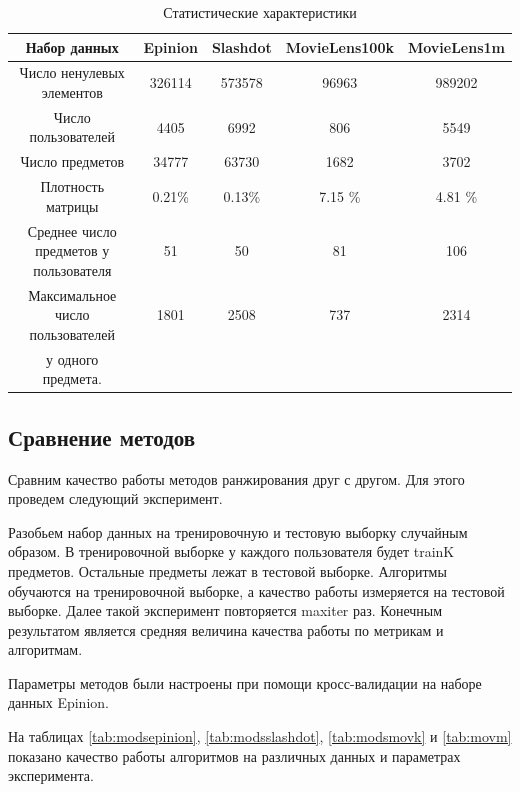 \documentclass[a4paper,12pt]{article}
\begin{document}
\begin{table}[H]
\caption{\label{tab:canonsummary}Статистические характеристики}
\begin{center}
\begin{tabular}{|c|c c c c|}
\hline
Набор данных  & Epinion & Slashdot & MovieLens100k & MovieLens1m\\
\hline
Число ненулевых элементов & 326114 & 573578 & 96963  & 989202 \\
Число пользователей & 4405 & 6992 & 806 & 5549\\
Число предметов & 34777 & 63730 & 1682 & 3702\\
Плотность матрицы & 0.21\% & 0.13\% & 7.15 \% & 4.81 \% \\
Среднее число предметов у пользователя & 51  & 50 & 81 & 106\\
Максимальное число пользователей & 1801 & 2508 & 737 & 2314\\
у одного предмета.  & & & &\\
\hline
\end{tabular}
\end{center}
\end{table} 

\subsection{Сравнение методов}
 Сравним качество работы методов ранжирования друг с другом. Для этого проведем следующий эксперимент.
 
 Разобьем набор данных на тренировочную и тестовую выборку случайным образом. В тренировочной выборке у каждого пользователя будет trainK предметов. Остальные предметы лежат в тестовой выборке. Алгоритмы обучаются на тренировочной выборке, а качество работы измеряется на тестовой выборке. Далее такой эксперимент повторяется maxiter раз. Конечным результатом является средняя величина качества работы по метрикам и алгоритмам. 
 
Параметры методов были настроены при помощи кросс-валидации на наборе данных Epinion. 
 
На таблицах \ref{tab:modsepinion}, \ref{tab:modsslashdot}, \ref{tab:modsmovk} и \ref{tab:movm} показано качество работы алгоритмов на различных данных и параметрах эксперимента.
\end{document}
